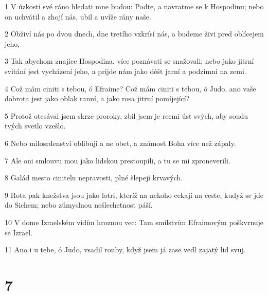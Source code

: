 \par 1 V úzkosti své ráno hledati mne budou: Podte, a navratme se k Hospodinu; nebo on uchvátil a zhojí nás, ubil a uvíže rány naše.
\par 2 Obživí nás po dvou dnech, dne tretího vzkrísí nás, a budeme živi pred oblícejem jeho,
\par 3 Tak abychom znajíce Hospodina, více poznávati se snažovali; nebo jako jitrní svitání jest vycházení jeho, a prijde nám jako déšt jarní a podzimní na zemi.
\par 4 Což mám ciniti s tebou, ó Efraime? Což mám ciniti s tebou, ó Judo, ano vaše dobrota jest jako oblak ranní, a jako rosa jitrní pomíjející?
\par 5 Protož otesával jsem skrze proroky, zbil jsem je recmi úst svých, aby soudu tvých svetlo vzešlo.
\par 6 Nebo milosrdenství oblibuji a ne obet, a známost Boha více než zápaly.
\par 7 Ale oni smlouvu mou jako lidskou prestoupili, a tu se mi zproneverili.
\par 8 Galád mesto cinitelu nepravosti, plné šlepejí krvavých.
\par 9 Rota pak knežstva jsou jako lotri, kteríž na nekoho cekají na ceste, kudyž se jde do Sichem; nebo zúmyslnou nešlechetnost páší.
\par 10 V dome Izraelském vidím hroznou vec: Tam smilstvím Efraimovým poškvrnuje se Izrael.
\par 11 Ano i u tebe, ó Judo, vsadil rouby, když jsem já zase vedl zajatý lid svuj.

\chapter{7}

